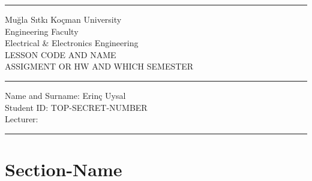 \documentclass[a4paper]{article}
\begin{document}
\par\rule{\textwidth}{1.5pt}
\par
\begin{center}
Muğla Sıtkı Koçman University \\ Engineering Faculty \\ Electrical \& Electronics Engineering \\ LESSON CODE AND NAME \\ ASSIGMENT OR HW AND WHICH SEMESTER

\end{center}
\par\noindent\rule{\textwidth}{1.5pt}
Name and Surname: Erinç Uysal \\
Student ID: TOP-SECRET-NUMBER \\ 
Lecturer: 
\par\noindent\rule{\textwidth}{1.5pt}
\par 
    \newpage
    \tableofcontents
    \newpage
    \section{Section-Name}
    \paragraph{}
\end{document}
